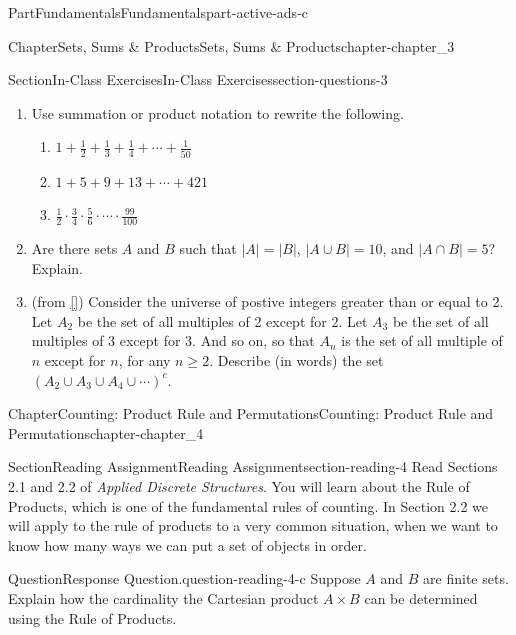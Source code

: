 \documentclass[oneside,10pt,]{book}
\newcommand{\xreffont}{\relax}
\numberwithin{equation}{section}
\begin{document}
\begin{partptx}{Part}{Fundamentals}{}{Fundamentals}{}{}{part-active-ads-c}
\begin{chapterptx}{Chapter}{Sets, Sums \& Products}{}{Sets, Sums \& Products}{}{}{chapter-chapter_3}
\begin{sectionptx}{Section}{In-Class Exercises}{}{In-Class Exercises}{}{}{section-questions-3}
\begin{enumerate}[label=\arabic*.]
\item{}Use summation or product notation to rewrite the following.%
\begin{enumerate}[label=(\alph*)]
\item{}\(\displaystyle 1 + \frac{1}{2} + \frac{1}{3}+ \frac{1}{4}+ \cdots + \frac{1}{50}\)%
\item{}\(\displaystyle 1 + 5 + 9 + 13 + \cdots + 421\)%
\item{}\(\displaystyle \frac{1}{2}\cdot \frac{3}{4}\cdot \frac{5}{6}\cdot \cdots 			 
\cdot\frac{99}{100}\)%
\end{enumerate}
%
\item{}Are there sets \(A\) and \(B\) such that \(|A| = |B|\), \(|A\cup B| = 10\), and \(|A\cap B| = 5\)?  Explain.%
\item{}(from \hyperlink{biblio-biblio-levin-2020}{[{\xreffont 3}]}) Consider the universe of postive integers greater than or equal to 2. Let \(A_2\) be the set of all multiples of 2 except for \(2\). Let \(A_3\) be the set of all multiples of 3 except for 3. And so on, so that \(A_n\) is the set of all multiple of \(n\) except for \(n\), for any \(n \ge 2\). Describe (in words) the set \(\left(A_2 \cup A_3 \cup A_4 \cup \cdots \right)^c\).%
\end{enumerate}
%
\end{sectionptx}
\end{chapterptx}
%
\typeout{************************************************}
\typeout{************************************************}
%
\begin{chapterptx}{Chapter}{Counting: Product Rule and Permutations}{}{Counting: Product Rule and Permutations}{}{}{chapter-chapter_4}
\renewcommand*{\chaptername}{Chapter}
\index{}%
%
%
\typeout{************************************************}
\typeout{************************************************}
%
\begin{sectionptx}{Section}{Reading Assignment}{}{Reading Assignment}{}{}{section-reading-4}
Read Sections 2.1 and 2.2 of \emph{Applied Discrete Structures}.  You will learn about the Rule of Products, which is one of the fundamental rules of counting.  In Section 2.2 we will apply to the rule of products to a very common situation, when we want to know how many ways we can put a set of objects in order.%
\begin{question}{Question}{Response Question.}{question-reading-4-c}%
Suppose \(A\) and \(B\) are finite sets.  Explain how the cardinality the Cartesian product \(A \times B\) can be determined using the Rule of Products.%

\end{question}
\end{sectionptx}
\end{chapterptx}
\end{partptx}
\end{document}
